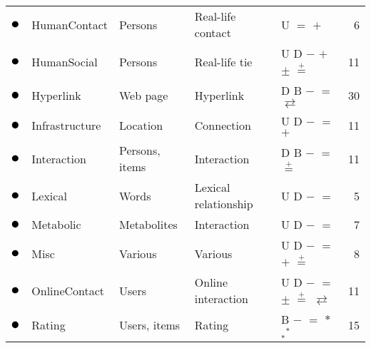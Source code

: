 \begin{tabular}{lllllr}
\textcolor{colorHumanContact}{$\newmoon$} &HumanContact & Persons & Real-life contact & U \phantom{D} \phantom{B} \phantom{$-$} $=$ $+$ \phantom{$\pm$} \phantom{$\stackrel{+}{=}$} \phantom{$*$} \phantom{$_*{}^*$} \phantom{$\rightleftarrows$} \phantom{$++$}  &  6\\
\textcolor{colorHumanSocial}{$\newmoon$} &HumanSocial & Persons & Real-life tie & U D \phantom{B} $-$ \phantom{$=$} $+$ $\pm$ $\stackrel{+}{=}$ \phantom{$*$} \phantom{$_*{}^*$} \phantom{$\rightleftarrows$} \phantom{$++$}  &  11\\
\textcolor{colorHyperlink}{$\newmoon$} &Hyperlink & Web page & Hyperlink & \phantom{U} D B $-$ $=$ \phantom{$+$} \phantom{$\pm$} \phantom{$\stackrel{+}{=}$} \phantom{$*$} \phantom{$_*{}^*$} $\rightleftarrows$ \phantom{$++$}  &  30\\
\textcolor{colorInfrastructure}{$\newmoon$} &Infrastructure & Location & Connection & U D \phantom{B} $-$ $=$ $+$ \phantom{$\pm$} \phantom{$\stackrel{+}{=}$} \phantom{$*$} \phantom{$_*{}^*$} \phantom{$\rightleftarrows$} \phantom{$++$}  &  11\\
\textcolor{colorInteraction}{$\newmoon$} &Interaction & Persons, items & Interaction & \phantom{U} D B $-$ $=$ \phantom{$+$} \phantom{$\pm$} $\stackrel{+}{=}$ \phantom{$*$} \phantom{$_*{}^*$} \phantom{$\rightleftarrows$} \phantom{$++$}  &  11\\
\textcolor{colorLexical}{$\newmoon$} &Lexical & Words & Lexical relationship & U D \phantom{B} $-$ $=$ \phantom{$+$} \phantom{$\pm$} \phantom{$\stackrel{+}{=}$} \phantom{$*$} \phantom{$_*{}^*$} \phantom{$\rightleftarrows$} \phantom{$++$}  &  5\\
\textcolor{colorMetabolic}{$\newmoon$} &Metabolic & Metabolites & Interaction & U D \phantom{B} $-$ $=$ \phantom{$+$} \phantom{$\pm$} \phantom{$\stackrel{+}{=}$} \phantom{$*$} \phantom{$_*{}^*$} \phantom{$\rightleftarrows$} \phantom{$++$}  &  7\\
\textcolor{colorMisc}{$\newmoon$} &Misc & Various & Various & U D \phantom{B} $-$ $=$ $+$ \phantom{$\pm$} $\stackrel{+}{=}$ \phantom{$*$} \phantom{$_*{}^*$} \phantom{$\rightleftarrows$} \phantom{$++$}  &  8\\
\textcolor{colorOnlineContact}{$\newmoon$} &OnlineContact & Users & Online interaction & U D \phantom{B} $-$ $=$ \phantom{$+$} $\pm$ $\stackrel{+}{=}$ \phantom{$*$} \phantom{$_*{}^*$} $\rightleftarrows$ \phantom{$++$}  &  11\\
\textcolor{colorRating}{$\newmoon$} &Rating & Users, items & Rating & \phantom{U} \phantom{D} B $-$ $=$ \phantom{$+$} \phantom{$\pm$} \phantom{$\stackrel{+}{=}$} $*$ $_*{}^*$ \phantom{$\rightleftarrows$} \phantom{$++$}  &  15\\

\end{tabular}
